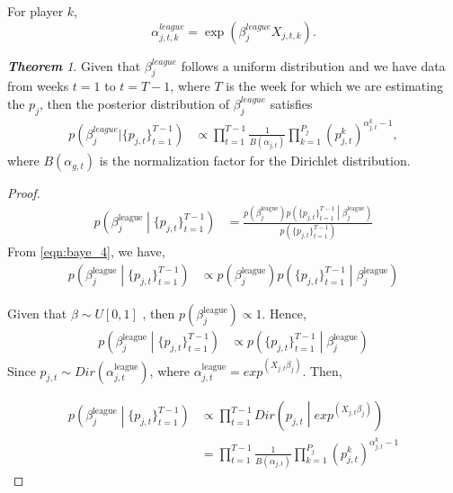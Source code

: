 \documentclass[12pt,oneside,a4paper]{book}
\theoremstyle{definition}
\theoremstyle{remark}
\newtheorem{thm}{\bf Theorem}[subsection]
\begin{document}
				For player $k$, $$ \alpha_{j,t, k}^{league} = \exp\left(\beta_{j}^{league} X_{j,t, k} \right).$$

				\begin{thm}
					Given that $\beta^{league}_{j}$ follows a uniform distribution and we have data from weeks $t=1$ to $t=T-1$, where $T$ is the week for which we are estimating the $p_j$, then the posterior distribution of $\beta_j^{league}$ satisfies
					\begin{equation}\label{Eq:beta_league}
						\begin{aligned}
							p(\beta_j^{league} | \{ p_{j,t}\}_{t=1}^{T-1})
							& \propto \prod_{t=1}^{T-1} \frac{1}{B(\alpha_{j,t})} \prod_{k=1}^{P_j}(p_{j,t}^k)^{\alpha_{j,t}^k-1},
						\end{aligned}
					\end{equation} where $B(\alpha_{g,t})$ is the normalization factor for the Dirichlet distribution.
				\end{thm}


				\begin{proof}
					\[
					\begin{aligned}
						p\left(\beta_j^{\text{league}} \middle| \{ p_{j,t}\}_{t=1}^{T-1}\right)
						& = \frac{p\left(\beta_j^{\text{league}}\right) p\left(\{ p_{j,t} \}_{t=1}^{T-1} \middle| \beta^{\text{league}}_j\right)}{p\left( \{ p_{j,t}\}_{t=1}^{T-1} \right)}
					\end{aligned}
					\]
					From \eqref{eqn:baye_4}, we have,
					\[
					\begin{aligned}
						p\left(\beta_j^{\text{league}} \middle| \{ p_{j,t}\}_{t=1}^{T-1}\right)
						 & \propto p\left(\beta_j^{\text{league}}\right) p\left(\{ p_{j,t} \}_{t=1}^{T-1} \middle| \beta^{\text{league}}_j\right)
					\end{aligned}
					\]

					Given that $\beta \sim U[0,1]$ , then $p\left(\beta_{j}^{\text{league}} \right) \propto 1$. Hence,
					\[
						\begin{aligned}
							p\left(\beta_j^{\text{league}} \middle| \{ p_{j,t}\}_{t=1}^{T-1}\right)
							& \propto p\left(\{ p_{j,t} \}_{t=1}^{T-1} \middle| \beta^{\text{league}}_j\right)
						\end{aligned}
					\]
					Since $p_{j,t} \sim Dir\left(\alpha^{\text{league}}_{j,t}\right)$, where $\alpha^{\text{league}}_{j,t} = exp^{\left(X_{j,t}\beta_{j}\right)}$. Then,

					\[
					\begin{aligned}
						p\left(\beta_j^{\text{league}} \middle| \{ p_{j,t}\}_{t=1}^{T-1}\right)
						& \propto \prod_{t=1}^{T-1} Dir\left( p_{j,t} \middle| exp^{\left(X_{j,t}\beta_{j}\right)}\right)\\
						& = \prod_{t=1}^{T-1} \frac{1}{B\left(\alpha_{j,t}\right)} \prod_{k=1}^{P_j}\left(p^k_{j,t}\right)^{\alpha^k_{j,t}-1}
					\end{aligned}
					\]\qedhere
				\end{proof}
\end{document}
